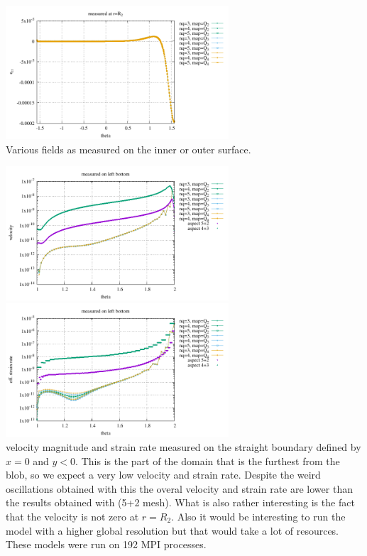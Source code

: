 \begin{center}
\includegraphics[width=8.3cm]{python_codes/fieldstone_152/results/exp2_axisymmetric/err_R2}\\
{\captionfont Various fields as measured on the inner or outer surface.}
\end{center}

\begin{center}
\includegraphics[width=8.3cm]{python_codes/fieldstone_152/results/exp2_axisymmetric/vel_left}
\includegraphics[width=8.3cm]{python_codes/fieldstone_152/results/exp2_axisymmetric/sr2_left}\\
{\captionfont velocity magnitude and strain rate measured on the straight boundary 
defined by $x=0$ and $y<0$. This is the part of the domain that is the furthest from the 
blob, so we expect a very low velocity and strain rate. Despite the weird oscillations
obtained with this \stone the overal velocity and strain rate are lower than the results obtained
with \aspect (5+2 mesh). What is also rather interesting is the fact that the \aspect velocity is
not zero at $r=R_2$. Also it would be interesting to run the \aspect model with a higher global resolution but that would take a lot of resources. These models were run on 192 MPI processes.}
\end{center}

